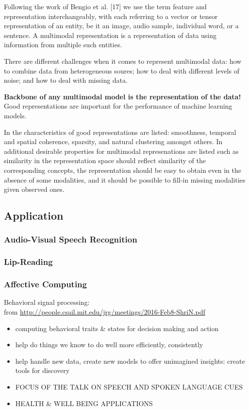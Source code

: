 Following the work of Bengio et al. [17]
we use the term feature and representation interchangeably, with each referring to a vector or tensor representation of an entity, be it an image, audio sample, individual word, or a sentence. A multimodal representation is a representation of data using information from multiple such entities. \cite{Baltruvsaitis2017multimodal}


There are different challenges when it comes to represent multimodal data: how to combine data from heterogeneous soures; how to deal with different levels of noise; and how to deal with missing data. \cite{Baltruvsaitis2017multimodal}

\textbf{Backbone of any multimodal model is the representation of the data!} Good representations are important for the performance of machine learning models.

In \cite{Bengio2013representation} the characteristics of good representations are listed: smoothness, temporal and spatial coherence, sparsity, and natural clustering amongst others. In \cite{Srivastava2012} additional desirable properties for multimodal represenations are listed such as similarity in the representation space should reflect similarity of the corresponding concepts, the representation should be easy to obtain even in the absence of some modalities, and it should be possible to fill-in missing modalities given observed ones.


\subsection{Application}
\subsubsection{Audio-Visual Speech Recognition}


\subsubsection{Lip-Reading}

\subsubsection{Affective Computing}

\cite{Narayanan2013} Behavioral signal processing: \\
from \url{http://people.csail.mit.edu/jrg/meetings/2016-Feb8-ShriN.pdf}\\
\begin{itemize}
    \item computing behavioral traits \& states for decision making and action
    \item help do things we know to do well more efficiently, consistently
    \item help handle new data, create new models to offer unimagined insights: create tools for discovery
    \item FOCUS OF THE TALK ON SPEECH AND SPOKEN LANGUAGE CUES
    \item HEALTH \& WELL BEING APPLICATIONS
\end{itemize}

